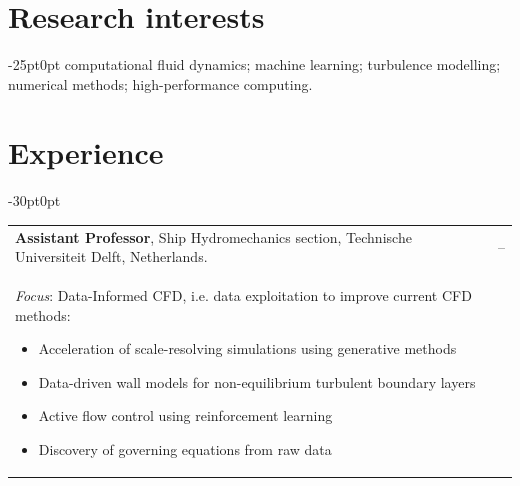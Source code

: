 \documentclass[line]{res}
\newenvironment{p1}
{\begin{adjustwidth}{-30pt}{0pt}
\vspace{8pt}}
{\end{adjustwidth}}
\newenvironment{p11}
{\begin{adjustwidth}{-25pt}{0pt}
\vspace{8pt}}
{\end{adjustwidth}}
\begin{document}



\begin{resume}
\section{}
\vspace{-15pt}
\\
\vspace{-15pt}
\noindent

\section{Research interests}
\begin{p11}
computational fluid dynamics; machine learning; turbulence modelling; numerical methods; high-performance computing.
\end{p11}

\section{Experience}

\begin{p1}
\begin{tabular}{p{} >{\raggedleft\arraybackslash}p{}}
	\textbf{Assistant Professor}, Ship Hydromechanics section, Technische Universiteit Delft, Netherlands. & 2024--\\
	\textit{Focus}: Data-Informed CFD, i.e. data exploitation to improve current CFD methods:
	\begin{itemize}
		\item Acceleration of scale-resolving simulations using generative methods
		\item Data-driven wall models for non-equilibrium turbulent boundary layers
		\item Active flow control using reinforcement learning
		\item Discovery of governing equations from raw data
	\end{itemize}
\end{tabular}


\end{p1}
\end{resume}
\end{document}
